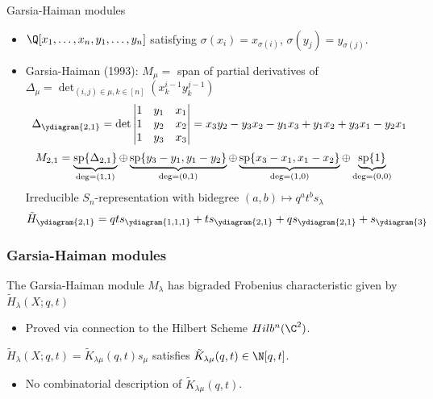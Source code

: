 \documentclass{beamer}
\renewcommand{\Span}{\operatorname{sp}}
\newcounter{c}
\begin{document}
\begin{frame}{Garsia-Haiman modules}
  \begin{itemize}
  \item \(\Q[x_1,\ldots,x_n,y_1,\ldots,y_n]\) satisfying
    \(\sigma(x_i) = x_{\sigma(i)}\), \(\sigma(y_j) = y_{\sigma(j)}\).\pause
  \item Garsia-Haiman (1993): \(M_\mu = \) span of partial derivatives of
    \(\Delta_\mu = \det_{(i,j) \in \mu, k \in [n]} (x_k^{i-1} y_k^{j-1})\) \pause \[
      \Delta_{\ydiagram{2,1}} = \det \left|
        \begin{matrix}
          1 & y_1 & x_1 \\
          1 & y_2 & x_2 \\
          1 & y_3 & x_3
        \end{matrix}
      \right| = x_3 y_2 - y_3 x_2 - y_1 x_3 + y_1 x_2 + y_3 x_1 - y_2 x_1
    \]
    \pause
  \[
    \hspace{-1em}
      M_{2,1} = \underbrace{\Span\{\Delta_{2,1}\}}_{\deg = (1,1)}
      \oplus \underbrace{\Span\{y_3-y_1, y_1 - y_2\}}_{\deg = (0,1)}
      \oplus \underbrace{\Span\{x_3-x_1, x_1 - x_2\}}_{\deg = (1,0)}
      \oplus \underbrace{\Span \{1\}}_{\deg = (0,0)}
    \]
    \pause
    Irreducible \(S_n\)-representation with bidegree \((a,b) \mapsto
    q^at^b s_\lambda\) \pause \[
      \tilde{H}_{\ydiagram{2,1}} = qt s_{\ydiagram{1,1,1}} + t
      s_{\ydiagram{2,1}} + q s_{\ydiagram{2,1}} + s_{\ydiagram{3}}
    \]
  \end{itemize}
\end{frame}
\begin{frame}
  \frametitle{Garsia-Haiman modules}
  \begin{theorem}[Haiman, 2001]
    The Garsia-Haiman module \(M_\lambda\) has bigraded Frobenius
    characteristic given by \(\tilde{H}_\lambda(X;q,t)\)
  \end{theorem}\pause
  \begin{itemize}
  \item Proved via connection to the Hilbert Scheme \(Hilb^n(\C^2)\).\pause
  \end{itemize}
  \begin{corollary}
    \(\tilde{H}_\lambda(X;q,t) = \tilde{K}_{\lambda \mu}(q,t) s_\mu\)
    satisfies \(\tilde{K}_{\lambda \mu}(q,t) \in \N[q,t]\).
  \end{corollary}\pause
  \begin{itemize}
  \item No combinatorial description of \(\tilde{K}_{\lambda \mu}(q,t)\).
  \end{itemize}
  \end{frame}
\end{document}

